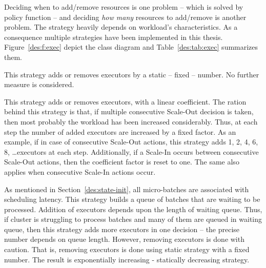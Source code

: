 Deciding when to add/remove resources is one problem -- which is solved by policy function -- and deciding \emph{how many} resources to add/remove is another problem. The strategy heavily depends on workload's characteristics. As a consequence multiple strategies have been implemented in this thesis. Figure~\ref{des:f:exec} depict the class diagram and Table~\ref{des:tab:exec} summarizes them.
\begin{description}[leftmargin=0pt]
    \item[Static Strategy] This strategy adds or removes executors by a static -- fixed -- number. No further measure is considered.
    \item[Linear Strategy] This strategy adds or removes executors, with a linear coefficient. The ration behind this strategy is that, if multiple consecutive Scale-Out decision is taken, then most probably the workload has been increased considerably. Thus, at each step the number of added executors are increased by a fixed factor. As an example, if in case of consecutive Scale-Out actions, this strategy adds 1, 2, 4, 6, 8, \dots executors at each step. Additionally, if a Scale-In occurs between consecutive Scale-Out actions, then the coefficient factor is reset to one. The same also applies when consecutive Scale-In actions occur. 
    \item[Queue Aware Strategy] As mentioned in Section~\ref{des:state-init}, all micro-batches are associated with scheduling latency. This strategy builds a queue of batches that are waiting to be processed. Addition of executors depends upon the length of waiting queue. Thus, if cluster is struggling to process batches and many of them are queued in waiting queue, then this strategy adds more executors in one decision -- the precise number depends on queue length. However, removing executors is done with caution. That is, removing executors is done using static strategy with a fixed number. The result is exponentially increasing - statically decreasing strategy.
\end{description}
